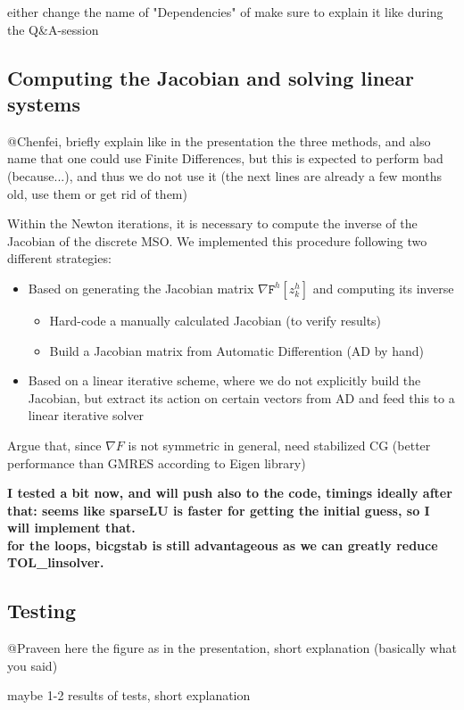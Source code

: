 \documentclass[11pt]{scrartcl}
\newcommand{\mSurfDisc}[1]{\ensuremath{\mathtt{F}^h\left[#1\right]}}
\begin{document}
either change the name of "Dependencies" of make sure to explain it like during the Q\&A-session

\subsection{Computing the Jacobian and solving linear systems}
@Chenfei, briefly explain like in the presentation the three methods, and also name that one could use Finite Differences, but this is expected to perform bad (because...), and thus we do not use it (the next lines are already a few months old, use them or get rid of them)

Within the Newton iterations, it is necessary to compute the inverse of the Jacobian of the discrete MSO. We implemented this procedure following two different strategies:
\begin{itemize}
	\item Based on generating the Jacobian matrix $\nabla\mSurfDisc{z^h_k}$ and computing its inverse
	\begin{itemize}
		\item Hard-code a manually calculated Jacobian (to verify results)
		\item Build a Jacobian matrix from Automatic Differention (AD by hand)
	\end{itemize}
	\item Based on a linear iterative scheme, where we do not explicitly build the Jacobian, but extract its action on certain vectors from AD and feed this to a linear iterative solver
\end{itemize}

Argue that, since $\nabla F$ is not symmetric in general, need stabilized CG (better performance than GMRES according to Eigen library)



	\textbf{I tested a bit now, and will push also to the code, timings ideally after that:
	seems like sparseLU is faster for getting the initial guess, so I will implement that.\\
	for the loops, bicgstab is still advantageous as we can greatly reduce TOL\_linsolver.}
\normal
\subsection{Testing}
@Praveen
here the figure as in the presentation, short explanation (basically what you said)

maybe 1-2 results of tests, short explanation
\end{document}
